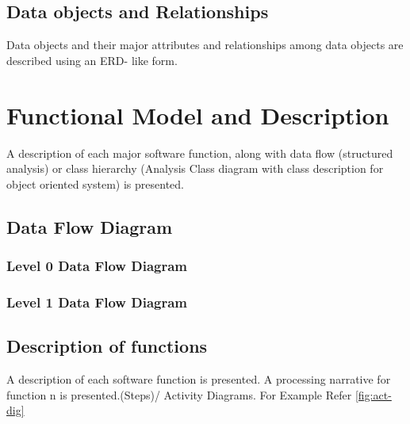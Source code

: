 \documentclass[oneside,a4paper,12pt]{report}
\begin{document}
\subsection{Data objects and Relationships}
  Data objects and their major attributes and relationships among data objects are described using an ERD- like form.



\section{Functional Model and Description}
A description of each major software function, along with data flow (structured analysis) or class hierarchy (Analysis Class diagram with class description for object oriented system) is presented.
\subsection{Data Flow Diagram}
\subsubsection{Level 0 Data Flow Diagram}
\subsubsection{Level 1 Data Flow Diagram}

\subsection{Description of functions}
A description of each software function is presented. A processing narrative for function n is presented.(Steps)/ Activity Diagrams. For Example Refer \ref{fig:act-dig}
\end{document}
